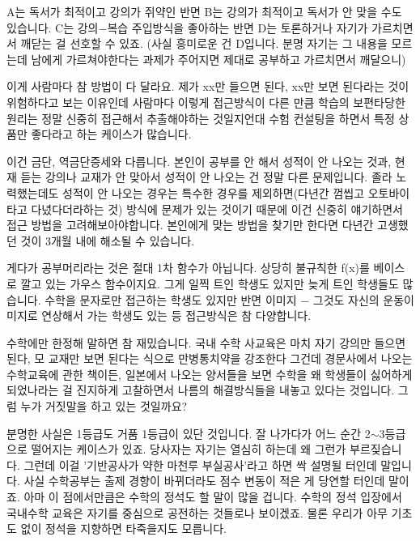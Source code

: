 \vspace{5mm}

A는 독서가 최적이고 강의가 쥐약인 반면
B는 강의가 최적이고 독서가 안 맞을 수도 있습니다.
C는 강의$-$복습 주입방식을 좋아하는 반면 D는 토론하거나 자기가 가르치면서 깨닫는 걸 선호할 수 있죠.
(사실 흥미로운 건 D입니다. 분명 자기는 그 내용을 모르는데 남에게 가르쳐야한다는 과제가 주어지면 제대로 공부하고 가르치면서 깨달으니)
\vspace{5mm}

이게 사람마다 참 방법이 다 달라요.
제가 xx만 들으면 된다, xx만 보면 된다라는 것이 위험하다고 보는 이유인데
사람마다 이렇게 접근방식이 다른 만큼 학습의 보편타당한 원리는 정말 신중히 접근해서 추출해야하는 것일지언대
수험 컨설팅을 하면서 특정 상품만 좋다라고 하는 케이스가 많습니다.
\vspace{5mm}

이건 금단, 역금단증세와 다릅니다.
본인이 공부를 안 해서 성적이 안 나오는 것과, 현재 듣는 강의나 교재가 안 맞아서 성적이 안 나오는 건 정말 다른 문제입니다.
졸라 노력했는데도 성적이 안 나오는 경우는 특수한 경우를 제외하면(다년간 껌씹고 오토바이타고 다녔다더라하는 것)
방식에 문제가 있는 것이기 때문에 이건 신중히 얘기하면서 접근 방법을 고려해보아야합니다.
본인에게 맞는 방법을 찾기만 한다면 다년간 고생했던 것이 3개월 내에 해소될 수 있습니다.
\vspace{5mm}

게다가 공부머리라는 것은 절대 1차 함수가 아닙니다. 상당히 불규칙한 f(x)를 베이스로 깔고 있는 가우스 함수이지요.
그게 일찍 트인 학생도 있지만 늦게 트인 학생들도 많습니다.
수학을 문자로만 접근하는 학생도 있지만 반면 이미지 $-$
그것도 자신의 운동이미지로 연상해서 가는 학생도 있는 등 접근방식은 참 다양합니다.
\vspace{5mm}

수학에만 한정해 말하면 참 재밌습니다.
국내 수학 사교육은 마치 자기 강의만 들으면 된다, 모 교재만 보면 된다는 식으로 만병통치약을 강조한다 그건데
경문사에서 나오는 수학교육에 관한 책이든, 일본에서 나오는 양서들을 보면
수학을 왜 학생들이 싫어하게 되었나라는 걸 진지하게 고찰하면서 나름의 해결방식들을 내놓고 있다는 것입니다.
그럼 누가 거짓말을 하고 있는 것일까요?
\vspace{5mm}

분명한 사실은 1등급도 거품 1등급이 있단 것입니다. 잘 나가다가 어느 순간 2$\sim$3등급으로 떨어지는 케이스가 있죠.
당사자는 자기는 열심히 하는데 왜 그런가 부르짖습니다. 그런데 이걸 '기반공사가 약한 마천루 부실공사'라고 하면 싹 설명될 터인데 말입니다.
사실 수학공부는 출제 경향이 바뀌더라도 점수 변동이 적은 게 당연할 터인데 말이죠.
아마 이 점에서만큼은 수학의 정석도 할 말이 많을 겁니다. 수학의 정석 입장에서 국내수학 교육은 자기를 중심으로 공전하는 것들로나 보이겠죠.
물론 우리가 아무 기초도 없이 정석을 지향하면 타죽을지도 모릅니다.
\vspace{5mm}

